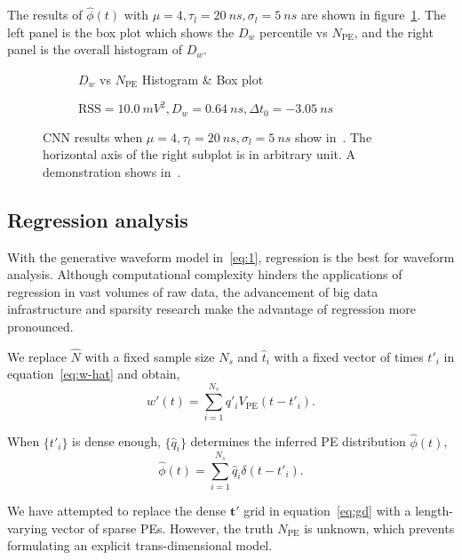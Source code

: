 The results of $\hat{\phi}(t)$ with $\mu=4, \tau_l=\SI{20}{ns}, \sigma_l=\SI{5}{ns}$ are shown in figure~\ref{fig:cnn-npe}. The left panel is the box plot which shows the $D_w$ percentile vs $N_{\mathrm{PE}}$, and the right panel is the overall histogram of $D_w$. 

\begin{figure}[H]
  \begin{subfigure}{.5\textwidth}
    \centering
    \resizebox{\textwidth}{!}{}
    \caption{\label{fig:cnn-npe} $D_w$ vs $N_{\mathrm{PE}}$ Histogram \& Box plot}
  \end{subfigure}
  \begin{subfigure}{.5\textwidth}
    \centering
    \resizebox{\textwidth}{!}{}
    \caption{\label{fig:cnn}$\mathrm{RSS}=\SI{10.0}{mV^2},D_w=\SI{0.64}{ns},\Delta t_0=\SI{-3.05}{ns}$}
  \end{subfigure}
  \caption{CNN results when $\mu=4, \tau_l=\SI{20}{ns}, \sigma_l=\SI{5}{ns}$ show in~. The horizontal axis of the right subplot is in arbitrary unit. A demonstration shows in~.}
\end{figure}

\subsection{Regression analysis}
\label{sec:regression}
With the generative waveform model in~\eqref{eq:1}, regression is the best for waveform analysis. Although computational complexity hinders the applications of regression in vast volumes of raw data, the advancement of big data infrastructure and sparsity research make the advantage of regression more pronounced.

We replace $\hat{N}$ with a fixed sample size $N_s$ and $\hat{t}_i$ with a fixed vector of times $t'_i$ in equation~\ref{eq:w-hat} and obtain, 
\begin{equation}
  \label{eq:gd}
  w'(t) = \sum_{i=1}^{N_s}q'_iV_\mathrm{PE}(t-t'_i).
\end{equation}

When $\{t'_i\}$ is dense enough, $\{\hat{q}_i\}$ determines the inferred PE distribution $\hat{\phi}(t)$,
\begin{equation}
  \label{eq:gd-phi}
  \hat{\phi}(t) = \sum_{i=1}^{N_s}\hat{q}_i\delta(t-t'_i).
\end{equation}

We have attempted to replace the dense $\bm{t'}$ grid in equation~\eqref{eq:gd} with a length-varying vector of sparse PEs. However, the truth $N_\mathrm{PE}$ is unknown, which prevents formulating an explicit trans-dimensional model. 

